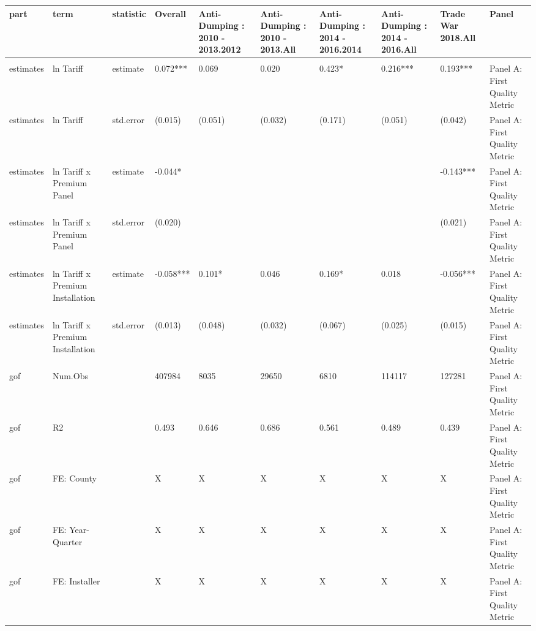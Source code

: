 \begin{table}[!h]
\centering
\begin{tabular}[t]{llllllllll}
\toprule
part & term & statistic & Overall & Anti-Dumping : 2010 - 2013.2012 & Anti-Dumping : 2010 - 2013.All & Anti-Dumping : 2014 - 2016.2014 & Anti-Dumping : 2014 - 2016.All & Trade War 2018.All & Panel\\
\midrule
\addlinespace[0.3em]
\multicolumn{10}{l}{\textbf{Panel A: First Quality Metric}}\\
\hspace{1em}estimates & ln Tariff & estimate & 0.072*** & 0.069 & 0.020 & 0.423* & 0.216*** & 0.193*** & Panel A: First Quality Metric\\
\hspace{1em}estimates & ln Tariff & std.error & (0.015) & (0.051) & (0.032) & (0.171) & (0.051) & (0.042) & Panel A: First Quality Metric\\
\hspace{1em}estimates & ln Tariff x Premium Panel & estimate & -0.044* &  &  &  &  & -0.143*** & Panel A: First Quality Metric\\
\hspace{1em}estimates & ln Tariff x Premium Panel & std.error & (0.020) &  &  &  &  & (0.021) & Panel A: First Quality Metric\\
\hspace{1em}estimates & ln Tariff x Premium Installation & estimate & -0.058*** & 0.101* & 0.046 & 0.169* & 0.018 & -0.056*** & Panel A: First Quality Metric\\
\hspace{1em}estimates & ln Tariff x Premium Installation & std.error & (0.013) & (0.048) & (0.032) & (0.067) & (0.025) & (0.015) & Panel A: First Quality Metric\\
\hspace{1em}gof & Num.Obs &  & 407984 & 8035 & 29650 & 6810 & 114117 & 127281 & Panel A: First Quality Metric\\
\hspace{1em}gof & R2 &  & 0.493 & 0.646 & 0.686 & 0.561 & 0.489 & 0.439 & Panel A: First Quality Metric\\
\hspace{1em}gof & FE: County &  & X & X & X & X & X & X & Panel A: First Quality Metric\\
\hspace{1em}gof & FE: Year-Quarter &  & X & X & X & X & X & X & Panel A: First Quality Metric\\
\hspace{1em}gof & FE: Installer &  & X & X & X & X & X & X & Panel A: First Quality Metric\\

\end{tabular}
\end{table}
